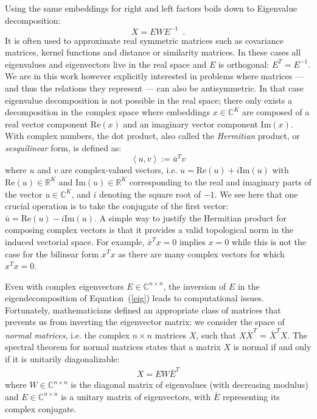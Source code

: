 \documentclass{article}
\newcommand{\transp}{^{T}}
\newcommand{\complexSpace}{\mathbb{C}}
\renewcommand{\Re}{\mathbb{R}}
\newcommand{\C}{\complexSpace} %
\newcommand{\real}{\mathrm{Re}}
\newcommand{\imag}{\mathrm{Im}}
\newcommand{\Johans}[1]{\todo[inline,backgroundcolor=green!20!green]{Johans: #1}}
\begin{document}
\newcommand{\normalSpace}{\mathcal{H}}
Using the same embeddings for right and left factors boils down to Eigenvalue decomposition: 
\begin{equation}
X=EWE^{-1}\enspace.
\label{eig}
\end{equation}
It is often used to approximate real symmetric matrices
such as covariance matrices, kernel functions and distance or similarity matrices. In these cases all eigenvalues and eigenvectors live in the real space and $E$ is orthogonal: $E\transp=E^{-1}$. 
We are in this work however explicitly interested in problems where matrices --- and thus the \mbox{relations} they represent ---
can also be antisymmetric. In that case eigenvalue decomposition is not possible in the real space; there only exists a decomposition in the complex space where embeddings $x\in\C^K$ are composed of a real vector component $\real(x)$ and an imaginary vector component $\imag(x)$. With complex numbers, the dot product, also called the \emph{Hermitian} product, or \emph{sesquilinear} form, is defined as: 
\begin{equation}
    \left< u,v \right>:= \bar{u}\transp v
\end{equation} 
where $u$ and $v$ are complex-valued vectors, i.e. $u=\real(u) + i\imag(u)$ with $\real(u)\in\Re^K$ and $\imag(u)\in\Re^K$ corresponding to the real and imaginary parts of the vector $u\in\C^K$, and $i$ denoting the square root of $-1$. We see here that one crucial operation is to take the conjugate of the first vector: $\bar{u}=\real(u) - i \imag(u)$.
A simple way to justify the Hermitian product for composing complex vectors is that it provides a valid topological norm in the induced vectorial space. For example, $\bar{x}\transp x=0$ implies $x=0$ while this is not the case for the bilinear form $x \transp x$ as there are many complex vectors for which $x\transp x=0$. 

Even with complex eigenvectors $E\in\C^{n\times n}$, the inversion of $E$ in the eigendecomposition of Equation~(\ref{eig}) leads to computational issues. Fortunately, mathematicians defined an appropriate class of matrices that prevents us from inverting the eigenvector matrix: we consider the space of \emph{normal matrices}, i.e. the complex $n \times n$ matrices $X$, such that $X \bar{X}\transp$ = $\bar{X}\transp X$. The spectral theorem for normal matrices states that a matrix $X$ is normal if and only if it is unitarily diagonalizable:
\begin{eqnarray}
X = E W \bar{E}^T
\label{eqn:eigendec}
\end{eqnarray}
where $W\in\C^{n \times n}$ is the diagonal matrix of eigenvalues 
(with decreasing modulus) and $E\in\C^{n\times n}$ is a unitary matrix of 
eigenvectors, with $\bar{E}$ representing its complex conjugate. 
\end{document}
